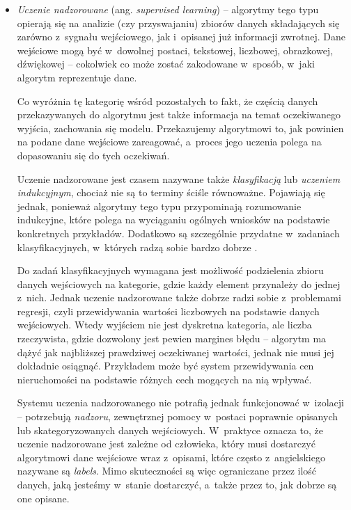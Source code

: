 \begin{itemize}

  \item \emph{Uczenie nadzorowane} (ang. \emph{supervised learning}) --
        algorytmy tego typu opierają się na analizie (czy przyswajaniu) zbiorów danych składających się zarówno z~sygnału wejściowego, jak i~opisanej już informacji zwrotnej.
        Dane wejściowe mogą być w~dowolnej postaci, tekstowej, liczbowej, obrazkowej, dźwiękowej -- cokolwiek co może zostać zakodowane w~sposób, w~jaki algorytm reprezentuje dane.

        Co wyróżnia tę kategorię wśród pozostałych to fakt, że częścią danych przekazywanych do algorytmu jest także informacja na temat oczekiwanego wyjścia, zachowania się modelu.
        Przekazujemy algorytmowi to, jak powinien na podane dane wejściowe zareagować, a~proces jego uczenia polega na dopasowaniu się do tych oczekiwań.

        Uczenie nadzorowane jest czasem nazywane także \emph{klasyfikacją} lub \emph{uczeniem indukcyjnym}, chociaż nie są to terminy ściśle równoważne.
        Pojawiają się jednak, ponieważ algorytmy tego typu przypominają rozumowanie indukcyjne, które polega na wyciąganiu ogólnych wniosków na podstawie konkretnych przykładów.
        Dodatkowo są szczególnie przydatne w~zadaniach klasyfikacyjnych, w~których radzą sobie bardzo dobrze \cite{hastie2009overview}.

        Do zadań klasyfikacyjnych wymagana jest możliwość podzielenia zbioru danych wejściowych na kategorie, gdzie każdy element przynależy do jednej z~nich.
        Jednak uczenie nadzorowane także dobrze radzi sobie z~problemami regresji, czyli przewidywania wartości liczbowych na podstawie danych wejściowych.
        Wtedy wyjściem nie jest dyskretna kategoria, ale liczba rzeczywista, gdzie dozwolony jest pewien margines błędu -- algorytm ma dążyć jak najbliższej prawdziwej oczekiwanej wartości, jednak nie musi jej dokładnie osiągnąć.
        Przykładem może być system przewidywania cen nieruchomości na podstawie różnych cech mogących na nią wpływać.

        Systemu uczenia nadzorowanego nie potrafią jednak funkcjonować w~izolacji -- potrzebują \emph{nadzoru}, zewnętrznej pomocy w~postaci poprawnie opisanych lub skategoryzowanych danych wejściowych.
        W~praktyce oznacza to, że uczenie nadzorowane jest zależne od człowieka, który musi dostarczyć algorytmowi dane wejściowe wraz z~opisami, które często z~angielskiego nazywane są \emph{labels}.
        Mimo skuteczności są więc ograniczane przez ilość danych, jaką jesteśmy w~stanie dostarczyć, a~także przez to, jak dobrze są one opisane.


\end{itemize}
